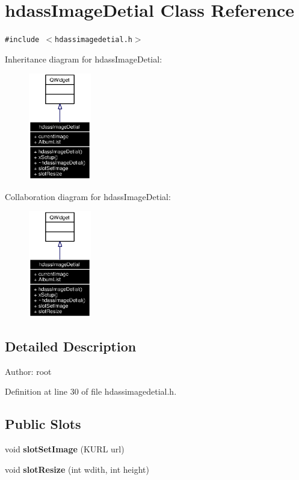\section{hdass\-Image\-Detial Class Reference}
\label{classhdassImageDetial}
{\tt \#include $<$hdassimagedetial.h$>$}

Inheritance diagram for hdass\-Image\-Detial:\begin{figure}[H]
\begin{center}
\leavevmode
\includegraphics[width=77pt]{classhdassImageDetial__inherit__graph}
\end{center}
\end{figure}
Collaboration diagram for hdass\-Image\-Detial:\begin{figure}[H]
\begin{center}
\leavevmode
\includegraphics[width=77pt]{classhdassImageDetial__coll__graph}
\end{center}
\end{figure}


\subsection{Detailed Description}
\begin{Desc}
\item[Author:]root \end{Desc}




Definition at line 30 of file hdassimagedetial.h.\subsection*{Public Slots}
\begin{CompactItemize}
\item 
void {\bf slot\-Set\-Image} (KURL url)
\item 
void {\bf slot\-Resize} (int wdith, int height)
\end{CompactItemize}
